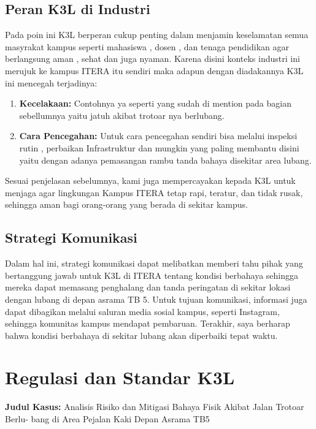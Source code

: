 \documentclass[a4paper, 12pt]{article}
\begin{document}
\subsection{Peran K3L di Industri}
Pada poin ini K3L berperan cukup penting dalam menjamin keselamatan semua masyrakat kampus seperti mahasiswa , dosen , dan tenaga pendidikan agar berlangsung aman , sehat dan juga nyaman. Karena disini konteks industri ini merujuk ke kampus ITERA itu sendiri maka adapun dengan diadakannya K3L ini mencegah terjadinya:
\begin{enumerate}
    \item \textbf{Kecelakaan:} Contohnya ya seperti yang sudah di mention pada bagian sebellumnya yaitu jatuh akibat trotoar nya berlubang.
    \item \textbf{Cara Pencegahan:} Untuk cara pencegahan sendiri bisa melalui inspeksi rutin , perbaikan Infrastruktur dan mungkin yang paling membantu disini yaitu dengan adanya pemasangan rambu tanda bahaya disekitar area lubang. 
\end{enumerate}
Sesuai penjelasan sebelumnya, kami juga mempercayakan kepada K3L untuk menjaga agar lingkungan Kampus ITERA tetap rapi, teratur, dan tidak rusak, sehingga aman bagi orang-orang yang berada di sekitar kampus.


\subsection{Strategi Komunikasi}
Dalam hal ini, strategi komunikasi dapat melibatkan memberi tahu pihak yang bertanggung jawab untuk K3L di ITERA tentang kondisi berbahaya sehingga mereka dapat memasang penghalang dan tanda peringatan di sekitar lokasi dengan lubang di depan asrama TB 5. Untuk tujuan komunikasi, informasi juga dapat dibagikan melalui saluran media sosial kampus, seperti Instagram, sehingga komunitas kampus mendapat pembaruan. Terakhir, saya berharap bahwa kondisi berbahaya di sekitar lubang akan diperbaiki tepat waktu.


\section{Regulasi dan Standar K3L}
\noindent\textbf{Judul Kasus:}  Analisis Risiko dan Mitigasi Bahaya Fisik Akibat Jalan Trotoar Berlu-
bang di Area Pejalan Kaki Depan Asrama TB5
\end{document}
